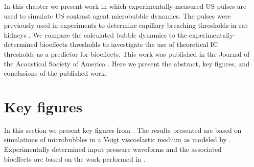 In this chapter we present work in which experimentally-measured
\ac{US} pulses are used to simulate \ac{US} contrast agent microbubble
dynamics. The pulses were previously used in experiments to determine
capillary breaching thresholds in rat kidneys \citep{Miller2008b}. We
compare the calculated bubble dynamics to the
experimentally-determined bioeffects thresholds to investigate the use
of theoretical \ac{IC} thresholds as a predictor for bioeffects. This
work was published in the Journal of the Acoustical Society of America
\citep{Patterson2012, Patterson2012a}. Here we present the abstract, key figures, and
conclusions of the published work.
%


\section{Key figures}
\label{sec:usbe_bubble_key_figures}
In this section we present key figures from \cite{Patterson2012a}. The
results presented are based on simulations of microbubbles in a Voigt
viscoelastic medium as modeled by \cite{Yang2005}. Experimentally
determined input pressure waveforms and the associated bioeffects are
based on the work performed in \cite{Miller2008b}.

